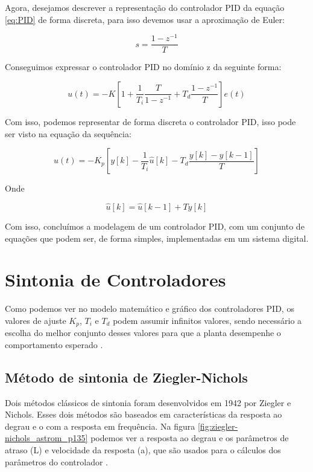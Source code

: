 Agora, desejamos descrever a representação do controlador PID da equação \ref{eq:PID} de forma discreta, para isso devemos usar a aproximação de Euler:

\begin{equation}
  s = \frac{1-z^{-1}}{T}
\end{equation}

Conseguimos expressar o controlador PID no domínio z da seguinte forma:

\begin{equation}
  u(t) = -K\left[1 + \frac{1}{T_i}\frac{T}{1-z^{-1}} + T_d\frac{1-z^{-1}}{T} \right]e(t)
\end{equation}

Com isso, podemos representar de forma discreta o controlador PID, isso pode ser visto na equação da sequência:

\begin{equation}
  u(t) = -K_p\left[y[k]-\frac{1}{T_i}{\hat{u}[k]}-T_d\frac{y[k]-y[k-1]}{T}\right]
\end{equation}

Onde

\begin{equation}
  \hat{u}[k] = \hat{u}[k-1] +Ty[k]
\end{equation}

Com isso, concluímos a modelagem de um controlador PID, com um conjunto de equações que podem ser, de forma simples, implementadas em um sistema digital.



\section{Sintonia de Controladores}

Como podemos ver no modelo matemático e gráfico dos controladores PID, os valores de ajuste $K_p$, $T_i$ e $T_d$  podem assumir infinitos valores, sendo necessário a escolha do melhor conjunto desses valores para que a planta desempenhe o comportamento esperado \cite{Ogata}.



\subsection{Método de sintonia de Ziegler-Nichols}

Dois métodos clássicos de sintonia foram desenvolvidos em 1942 por Ziegler e Nichols. Esses dois métodos são baseados em características da resposta ao degrau e o com a resposta em frequência. Na figura \ref{fig:ziegler-nichols_astrom_p135} podemos ver a resposta ao degrau e os parâmetros de atraso (L) e velocidade da resposta (a), que são usados para o cálculos dos parâmetros do controlador  \cite{Astrom1995}. 

